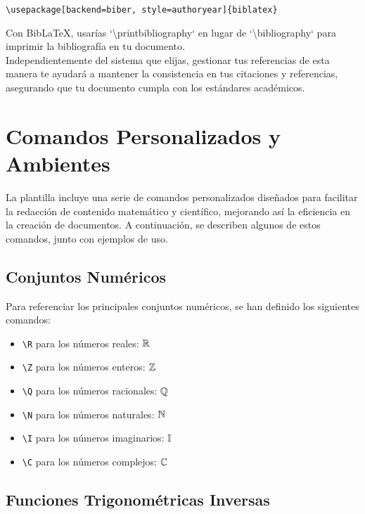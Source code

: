 \documentclass[11pt]{article}
\begin{document}
\begin{verbatim}
\usepackage[backend=biber, style=authoryear]{biblatex}

\end{verbatim}

Con BibLaTeX, usarías `\textbackslash printbibliography` en lugar de `\textbackslash bibliography` para imprimir la bibliografía en tu documento.\\

Independientemente del sistema que elijas, gestionar tus referencias de esta manera te ayudará a mantener la consistencia en tus citaciones y referencias, asegurando que tu documento cumpla con los estándares académicos.

\section{Comandos Personalizados y Ambientes}

La plantilla incluye una serie de comandos personalizados diseñados para facilitar la redacción de contenido matemático y científico, mejorando así la eficiencia en la creación de documentos. A continuación, se describen algunos de estos comandos, junto con ejemplos de uso.

\subsection{Conjuntos Numéricos}

Para referenciar los principales conjuntos numéricos, se han definido los siguientes comandos:

\begin{itemize}
    \item \texttt{\textbackslash R} para los números reales: $\mathbb{R}$
    \item \texttt{\textbackslash Z} para los números enteros: $\mathbb{Z}$
    \item \texttt{\textbackslash Q} para los números racionales: $\mathbb{Q}$
    \item \texttt{\textbackslash N} para los números naturales: $\mathbb{N}$
    \item \texttt{\textbackslash I} para los números imaginarios: $\mathbb{I}$
    \item \texttt{\textbackslash C} para los números complejos: $\mathbb{C}$
\end{itemize}

\subsection{Funciones Trigonométricas Inversas}
\end{document}

